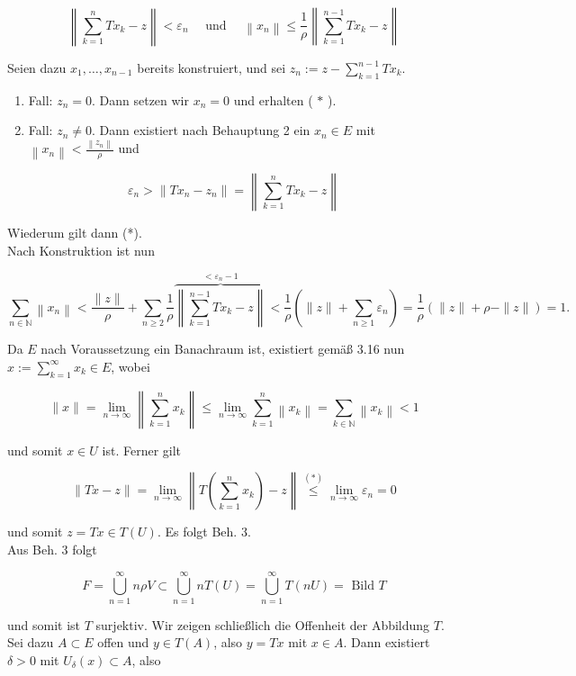 \documentclass[10pt, letterpaper]{article}
\begin{document}
$$
\left\|\sum_{k=1}^{n} T x_{k}-z\right\|<\varepsilon_{n} \quad \text { und } \quad\left\|x_{n}\right\| \leq \frac{1}{\rho}\left\|\sum_{k=1}^{n-1} T x_{k}-z\right\|
$$

Seien dazu $x_{1}, \ldots, x_{n-1}$ bereits konstruiert, und sei $z_{n}:=z-\sum_{k=1}^{n-1} T x_{k}$.

\begin{enumerate}
  \item Fall: $z_{n}=0$. Dann setzen wir $x_{n}=0$ und erhalten ( $*$ ).
  \item Fall: $z_{n} \neq 0$. Dann existiert nach Behauptung 2 ein $x_{n} \in E$ mit $\left\|x_{n}\right\|<\frac{\left\|z_{n}\right\|}{\rho}$ und
\end{enumerate}

$$
\varepsilon_{n}>\left\|T x_{n}-z_{n}\right\|=\left\|\sum_{k=1}^{n} T x_{k}-z\right\|
$$

Wiederum gilt dann (*).\\
Nach Konstruktion ist nun

$$
\sum_{n \in \mathbb{N}}\left\|x_{n}\right\|<\frac{\|z\|}{\rho}+\sum_{n \geq 2} \frac{1}{\rho} \overbrace{\left\|\sum_{k=1}^{n-1} T x_{k}-z\right\|}^{<\varepsilon_{n}-1}<\frac{1}{\rho}\left(\|z\|+\sum_{n \geq 1} \varepsilon_{n}\right)=\frac{1}{\rho}(\|z\|+\rho-\|z\|)=1 .
$$

Da $E$ nach Voraussetzung ein Banachraum ist, existiert gemäß 3.16 nun $x:= \sum_{k=1}^{\infty} x_{k} \in E$, wobei

$$
\|x\|=\lim _{n \rightarrow \infty}\left\|\sum_{k=1}^{n} x_{k}\right\| \leq \lim _{n \rightarrow \infty} \sum_{k=1}^{n}\left\|x_{k}\right\|=\sum_{k \in \mathbb{N}}\left\|x_{k}\right\|<1
$$

und somit $x \in U$ ist. Ferner gilt

$$
\|T x-z\|=\lim _{n \rightarrow \infty}\left\|T\left(\sum_{k=1}^{n} x_{k}\right)-z\right\| \stackrel{(*)}{\leq} \lim _{n \rightarrow \infty} \varepsilon_{n}=0
$$

und somit $z=T x \in T(U)$. Es folgt Beh. 3.\\
Aus Beh. 3 folgt

$$
F=\bigcup_{n=1}^{\infty} n \rho V \subset \bigcup_{n=1}^{\infty} n T(U)=\bigcup_{n=1}^{\infty} T(n U)=\text { Bild } T
$$

und somit ist $T$ surjektiv. Wir zeigen schließlich die Offenheit der Abbildung $T$. Sei dazu $A \subset E$ offen und $y \in T(A)$, also $y=T x$ mit $x \in A$. Dann existiert $\delta>0$ mit $U_{\delta}(x) \subset A$, also
\end{document}
